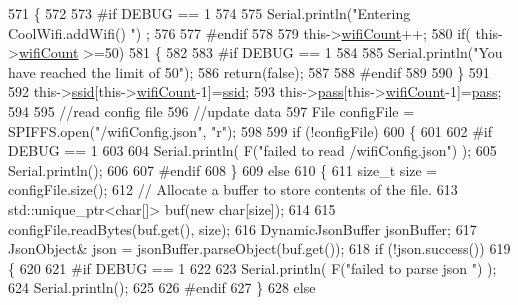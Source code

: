 \begin{DoxyCode}
571 \{
572 
573 \textcolor{preprocessor}{#if DEBUG == 1}
574     
575     Serial.println(\textcolor{stringliteral}{"Entering CoolWifi.addWifi() "}) ;
576 
577 \textcolor{preprocessor}{#endif  }
578     
579     this->\hyperlink{class_cool_wifi_ab133bd92fcb895b884deecd6678592e4}{wifiCount}++;
580     \textcolor{keywordflow}{if}( this->\hyperlink{class_cool_wifi_ab133bd92fcb895b884deecd6678592e4}{wifiCount} >=50)
581     \{
582     
583 \textcolor{preprocessor}{    #if DEBUG == 1}
584 
585         Serial.println(\textcolor{stringliteral}{"You have reached the limit of 50"});
586         \textcolor{keywordflow}{return}(\textcolor{keyword}{false});  
587     
588 \textcolor{preprocessor}{    #endif}
589 
590     \}
591 
592     this->\hyperlink{class_cool_wifi_a893b21d0fed821438733bba2e73fb4c2}{ssid}[this->\hyperlink{class_cool_wifi_ab133bd92fcb895b884deecd6678592e4}{wifiCount}-1]=\hyperlink{class_cool_wifi_a893b21d0fed821438733bba2e73fb4c2}{ssid};
593     this->\hyperlink{class_cool_wifi_a0c3332a149245aaad060b32593a54c9b}{pass}[this->\hyperlink{class_cool_wifi_ab133bd92fcb895b884deecd6678592e4}{wifiCount}-1]=\hyperlink{class_cool_wifi_a0c3332a149245aaad060b32593a54c9b}{pass};
594     
595     \textcolor{comment}{//read config file}
596     \textcolor{comment}{//update data}
597     File configFile = SPIFFS.open(\textcolor{stringliteral}{"/wifiConfig.json"}, \textcolor{stringliteral}{"r"});
598 
599     \textcolor{keywordflow}{if} (!configFile) 
600     \{
601     
602 \textcolor{preprocessor}{    #if DEBUG == 1 }
603 
604         Serial.println( F(\textcolor{stringliteral}{"failed to read /wifiConfig.json"}) );
605         Serial.println();
606 
607 \textcolor{preprocessor}{    #endif}
608     \}
609     \textcolor{keywordflow}{else}
610     \{
611         \textcolor{keywordtype}{size\_t} size = configFile.size();
612         \textcolor{comment}{// Allocate a buffer to store contents of the file.}
613         std::unique\_ptr<char[]> buf(\textcolor{keyword}{new} \textcolor{keywordtype}{char}[size]);
614 
615         configFile.readBytes(buf.get(), size);
616         DynamicJsonBuffer jsonBuffer;
617         JsonObject& json = jsonBuffer.parseObject(buf.get());
618         \textcolor{keywordflow}{if} (!json.success()) 
619         \{
620         
621 \textcolor{preprocessor}{        #if DEBUG == 1 }
622 
623             Serial.println( F(\textcolor{stringliteral}{"failed to parse json "}) );
624             Serial.println();
625         
626 \textcolor{preprocessor}{        #endif}
627         \} 
628         \textcolor{keywordflow}{else}

\end{DoxyCode}
